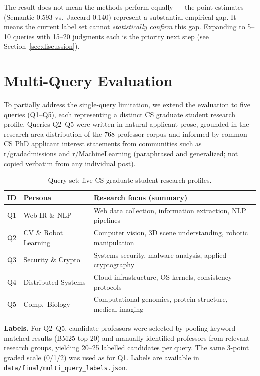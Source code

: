 \documentclass[11pt,a4paper]{article}
\begin{document}
The result does not mean the methods perform equally --- the point
estimates (Semantic 0.593 vs.\ Jaccard 0.140) represent a substantial
empirical gap. It means the current label set cannot \emph{statistically
confirm} this gap. Expanding to 5--10 queries with 15--20 judgments each
is the priority next step (see Section~\ref{sec:discussion}).

\section{Multi-Query Evaluation}
\label{sec:multiq}

To partially address the single-query limitation, we extend the evaluation to
five queries (Q1--Q5), each representing a distinct CS graduate student
research profile. Queries Q2--Q5 were written in natural applicant prose,
grounded in the research area distribution of the 768-professor corpus and
informed by common CS PhD applicant interest statements from communities
such as r/gradadmissions and r/MachineLearning (paraphrased and generalized;
not copied verbatim from any individual post).

\begin{table}[H]
\centering
\caption{Query set: five CS graduate student research profiles.}
\label{tab:queries}
\begin{tabular}{llp{7.5cm}}
\toprule
\textbf{ID} & \textbf{Persona} & \textbf{Research focus (summary)} \\
\midrule
Q1 & Web IR \& NLP         & Web data collection, information extraction, NLP pipelines \\
Q2 & CV \& Robot Learning  & Computer vision, 3D scene understanding, robotic manipulation \\
Q3 & Security \& Crypto    & Systems security, malware analysis, applied cryptography \\
Q4 & Distributed Systems   & Cloud infrastructure, OS kernels, consistency protocols \\
Q5 & Comp.\ Biology        & Computational genomics, protein structure, medical imaging \\
\bottomrule
\end{tabular}
\end{table}

\textbf{Labels.}
For Q2--Q5, candidate professors were selected by pooling keyword-matched
results (BM25 top-20) and manually identified professors from relevant
research groups, yielding 20--25 labelled candidates per query.
The same 3-point graded scale (0/1/2) was used as for Q1.
Labels are available in \texttt{data/final/multi\_query\_labels.json}.
\end{document}
